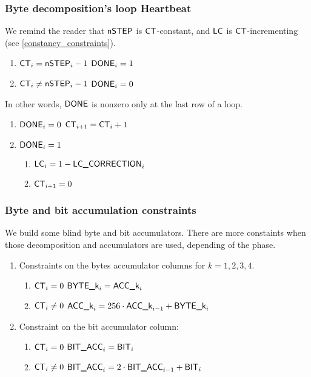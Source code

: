 \subsubsection{Byte decomposition's loop Heartbeat}
\begin{center}
\end{center}
We remind the reader that $\textsf{nSTEP}$ is $\textsf{CT}$-constant, and $\textsf{LC}$ is $\textsf{CT}$-incrementing (see \ref{constancy_constraints}).
\begin{enumerate}
    \item \If $\textsf{CT}_{i}=\textsf{nSTEP}_{i}-1$ \Then $\textsf{DONE}_{i}=1$ 
    \item \If $\textsf{CT}_{i} \ne \textsf{nSTEP}_{i}-1$ \Then $\textsf{DONE}_{i}=0$
\end{enumerate}
In other words, $\textsf{DONE}$ is nonzero only at the last row of a loop.
\begin{enumerate}[resume]
    \item \If $\textsf{DONE}_{i}=0$ \Then $\textsf{CT}_{i+1} = \textsf{CT}_{i} +1$
    \item \If $\textsf{DONE}_{i}=1$ \Then 
    \begin{enumerate}
        \item $\textsf{LC}_{i}=1-\textsf{LC\_CORRECTION}_{i}$
        \item $\textsf{CT}_{i+1} = 0$
    \end{enumerate}
\end{enumerate}

\subsubsection{Byte and bit accumulation constraints}
We build some blind byte and bit accumulators. There are more constaints when those decomposition and accumulators are used, depending of the phase. 
\begin{enumerate}
    \item Constraints on the bytes accumulator columns for $k= 1,2, 3, 4$. 
    \begin{enumerate}
        \item \If $\textsf{CT}_{i}=0$ \Then $\textsf{BYTE}\textsf{\_k}_{i} = \textsf{ACC}\textsf{\_k}_{i}$
        \item \If $\textsf{CT}_{i} \ne 0$  \Then $\textsf{ACC}\textsf{\_k}_{i}=256 \cdot \textsf{ACC}\textsf{\_k}_{i-1} + \textsf{BYTE}\textsf{\_k}_{i}$
    \end{enumerate}
    \item Constraint on the bit accumulator column:
    \begin{enumerate}
        \item \If $\textsf{CT}_{i}=0$ \Then $\textsf{BIT\_ACC}_{i} = \textsf{BIT}_{i}$
        \item \If $\textsf{CT}_{i} \ne 0$  \Then $\textsf{BIT\_ACC}_{i}=2 \cdot \textsf{BIT\_ACC}_{i-1} + \textsf{BIT}_{i}$
    \end{enumerate}
\end{enumerate}

